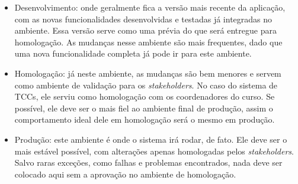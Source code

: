 \begin{itemize}
    \item Desenvolvimento: onde geralmente fica a versão mais recente da aplicação, com as novas funcionalidades desenvolvidas e testadas já integradas no ambiente. Essa versão serve como uma prévia do que será entregue para homologação. As mudanças nesse ambiente são mais frequentes, dado que uma nova funcionalidade completa já pode ir para este ambiente.

    \item Homologação: já neste ambiente, as mudanças são bem menores e servem como ambiente de validação para os \textit{stakeholders}. No caso do sistema de TCCs, ele serviu como homologação com os coordenadores do curso. Se possível, ele deve ser o mais fiel ao ambiente final de produção, assim o comportamento ideal dele em homologação será o mesmo em produção.

    \item Produção: este ambiente é onde o sistema irá rodar, de fato. Ele deve ser o mais estável possível, com alterações apenas homologadas pelos \textit{stakeholders}. Salvo raras exceções, como falhas e problemas encontrados, nada deve ser colocado aqui sem a aprovação no ambiente de homologação.
\end{itemize}
